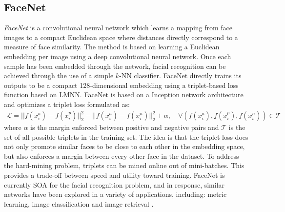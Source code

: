 		\subsection{FaceNet}
		\textit{FaceNet} \citep{Schroff2015FaceNet} is a convolutional neural network which learns a mapping from face images to a compact Euclidean space where distances directly correspond to a measure of face similarity.  The method is based on learning a Euclidean embedding per image using a deep convolutional neural network.  Once each sample has been embedded through the network,  facial recognition can be achieved through the use of a simple $k$-NN classifier.  FaceNet  directly trains its outputs to be a compact 128-dimensional embedding  using a triplet-based loss function based on LMNN. FaceNet is based on a Inception network architecture and  optimizes a triplet loss formulated as:
		\begin{align}
		\mathcal{L} = ||f(x^{a}_{i}) - f(x^{p}_{i})||^{2}_{2} -||f(x^{a}_{i}) - f(x^{n}_{i})||^{2}_{2} + \alpha, \quad \forall (f(x^{a}_{i}),f(x^{p}_{i}),f(x^{n}_{i})) \in \mathcal{T}
		\end{align} 
		where $\alpha$ is the margin enforced between positive and negative pairs and $\mathcal{T}$ is the set of all possible triplets in the training set.  The idea is that the triplet loss does not only promote similar faces to be close to each other in the embedding space, but also enforces a margin between every other face in the dataset.  To address the hard-mining problem,  triplets can be mined online out of mini-batches.  This provides a trade-off between speed and utility toward training.  FaceNet is currently SOA for the facial recognition problem, and in response, similar networks have been explored in a variety of applications, including: metric learning, image classification and image retrieval \citep{Hoffer2015DeepMetricLearning}.
		
		

	
	



